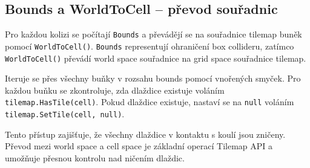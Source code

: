 \subsection{Bounds a WorldToCell -- převod souřadnic}

Pro každou kolizi se počítají \texttt{Bounds} a převádějí se na souřadnice tilemap buněk pomocí \texttt{WorldToCell()}. \texttt{Bounds} representují ohraničení box collideru, zatímco \texttt{WorldToCell()} převádí world space souřadnice na grid space souřadnice tilemap.

Iteruje se přes všechny buňky v rozsahu bounds pomocí vnořených smyček. Pro každou buňku se zkontroluje, zda dlaždice existuje voláním \texttt{tilemap.HasTile(cell)}. Pokud dlaždice existuje, nastaví se na \texttt{null} voláním \texttt{tilemap.SetTile(cell, null)}.

Tento přístup zajišťuje, že všechny dlaždice v kontaktu s koulí jsou zničeny. Převod mezi world space a cell space je základní operací Tilemap API a umožňuje přesnou kontrolu nad ničením dlaždic.